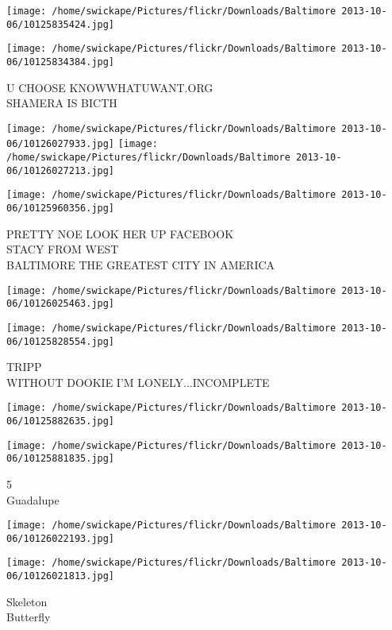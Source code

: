 \documentclass[10pt,letterpaper]{article}
\begin{document}
\texttt{[image: /home/swickape/Pictures/flickr/Downloads/Baltimore 2013-10-06/10125835424.jpg]}

\vspace{0.25in}
\texttt{[image: /home/swickape/Pictures/flickr/Downloads/Baltimore 2013-10-06/10125834384.jpg]}

U CHOOSE KNOWWHATUWANT.ORG\\
SHAMERA IS BICTH
\pagebreak

\texttt{[image: /home/swickape/Pictures/flickr/Downloads/Baltimore 2013-10-06/10126027933.jpg]}
\texttt{[image: /home/swickape/Pictures/flickr/Downloads/Baltimore 2013-10-06/10126027213.jpg]}

\vspace{0.25in}
\texttt{[image: /home/swickape/Pictures/flickr/Downloads/Baltimore 2013-10-06/10125960356.jpg]}

PRETTY NOE LOOK HER UP FACEBOOK\\
STACY FROM WEST\\
BALTIMORE THE GREATEST CITY IN AMERICA
\pagebreak

\texttt{[image: /home/swickape/Pictures/flickr/Downloads/Baltimore 2013-10-06/10126025463.jpg]}

\vspace{0.25in}
\texttt{[image: /home/swickape/Pictures/flickr/Downloads/Baltimore 2013-10-06/10125828554.jpg]}

TRIPP\\
WITHOUT DOOKIE I'M LONELY...INCOMPLETE
\pagebreak

\texttt{[image: /home/swickape/Pictures/flickr/Downloads/Baltimore 2013-10-06/10125882635.jpg]}

\vspace{0.25in}
\texttt{[image: /home/swickape/Pictures/flickr/Downloads/Baltimore 2013-10-06/10125881835.jpg]}

5\\
Guadalupe
\pagebreak

\texttt{[image: /home/swickape/Pictures/flickr/Downloads/Baltimore 2013-10-06/10126022193.jpg]}

\vspace{0.25in}
\texttt{[image: /home/swickape/Pictures/flickr/Downloads/Baltimore 2013-10-06/10126021813.jpg]}

Skeleton\\
Butterfly
\pagebreak
\end{document}
